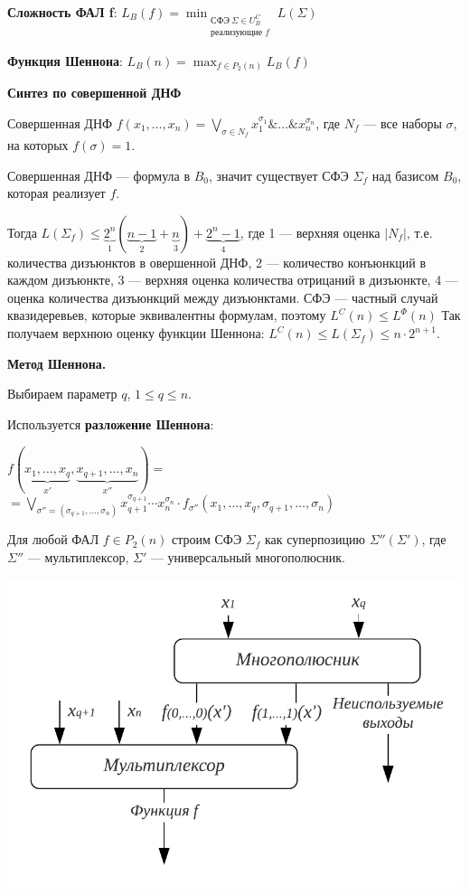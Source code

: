 \textbf{Сложность ФАЛ f}: $L_B(f) = \displaystyle \min_{\substack{\text{СФЭ}~\Sigma \in U_B^C \\ \text{реализующие }f}} L(\Sigma)$

\textbf{Функция Шеннона}: $L_B(n) = \displaystyle \max_{f \in P_2(n)} L_B(f)$
    
\bigbreak
\textbf{Синтез по совершенной ДНФ} 
    
Совершенная ДНФ $f(x_1,\dots,x_n) = \displaystyle\bigvee_{\sigma \in N_f} x_1^{\sigma_1} \&\dots\&x_n^{\sigma_n}$, где $N_f$ --- все наборы $\sigma$, на которых $f(\sigma) = 1$.

Совершенная ДНФ --- формула в $B_0$, значит существует СФЭ $\Sigma_f$ над базисом $B_0$, которая реализует $f$. 

Тогда 
$L(\Sigma_f) \leqslant \underbrace{2^n}_{1}(\underbrace{n - 1}_{2} + \underbrace{n}_{3} ) + \underbrace{2^n - 1}_{4}$,
где 1 --- верхняя оценка $|N_f |$, т.е. количества дизъюнктов в овершенной ДНФ, 2 --- количество конъюнкций в каждом дизъюнкте, 3 --- верхняя оценка количества отрицаний в дизъюнкте, 4 --- оценка количества дизъюнкций между дизъюнктами. СФЭ --- частный случай квазидеревьев, которые эквивалентны формулам, поэтому  $L^C(n) \leqslant L^{\Phi}(n)$
Так получаем верхнюю оценку функции Шеннона: $L^C(n) \leqslant L(\Sigma_f) \leqslant n \cdot 2^{n+1}$.

\bigbreak    
\textbf{Метод Шеннона.}
    
Выбираем параметр $q$, $1 \leqslant q \leqslant n$.

Используется \textbf{разложение Шеннона}:

$f(\underbrace{x_1,\dots,x_q}_{x'},\underbrace{x_{q+1},\dots,x_n}_{x''}) = $ \\
$= \displaystyle\bigvee_{\sigma''=(\sigma_{q+1},\dots,\sigma_n)} x_{q+1}^{\sigma_{q+1}}\cdots x_n^{\sigma_n}\cdot f_{\sigma''}(x_1,\dots,x_q,\sigma_{q+1},\dots,\sigma_n)$

Для любой ФАЛ $f \in P_2(n)$ строим СФЭ $\Sigma_f$ как суперпозицию $\Sigma''(\Sigma')$, где $\Sigma''$ --- мультиплексор, $\Sigma'$ --- универсальный многополюсник.

\includegraphics[width=0.9\columnwidth]{pics/osn27_oki.png}

